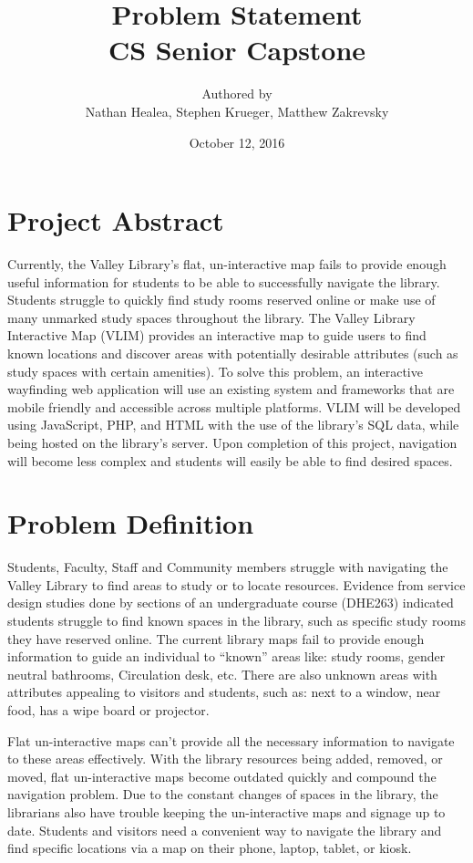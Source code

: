 \documentclass[letterpaper,10pt,titlepage]{article}
\title{Problem Statement \\ CS Senior Capstone}
\author{Authored by \\ Nathan Healea, Stephen Krueger, Matthew Zakrevsky}
\date{October 12, 2016}
\begin{document}
\maketitle
\newpage

\section*{Project Abstract}
Currently, the Valley Library's flat, un-interactive map fails to provide enough useful information for students to be able to successfully navigate the library. Students struggle to quickly find study rooms reserved online or make use of many unmarked study spaces throughout the library. The Valley Library Interactive Map (VLIM) provides an interactive map to guide users to find known locations and discover areas with potentially desirable attributes (such as study spaces with certain amenities). To solve this problem, an interactive wayfinding web application will use an existing system and frameworks that are mobile friendly and accessible across multiple platforms. VLIM will be developed using JavaScript, PHP, and HTML with the use of the library's SQL data, while being hosted on the library's server. Upon completion of this project, navigation will become less complex and students will easily be able to find desired spaces.

\section*{Problem Definition}
Students, Faculty, Staff and Community members struggle with navigating the Valley Library to find areas to study or to locate resources. Evidence from service design studies done by sections of an undergraduate course (DHE263) indicated students struggle to find known spaces in the library, such as specific study rooms they have reserved online. The current library maps fail to provide enough information to guide an individual to “known” areas like: study rooms, gender neutral bathrooms, Circulation desk, etc. There are also unknown areas with attributes appealing to visitors and students, such as: next to a window, near food, has a wipe board or projector. 

Flat un-interactive maps can’t provide all the necessary information to navigate to these areas effectively. With the library resources being added, removed, or moved, flat un-interactive maps become outdated quickly and compound the navigation problem. Due to the constant changes of spaces in the library, the librarians also have trouble keeping the un-interactive maps and signage up to date. Students and visitors need a convenient way to navigate the library and find specific locations via a map on their phone, laptop, tablet, or kiosk. 
\end{document}
